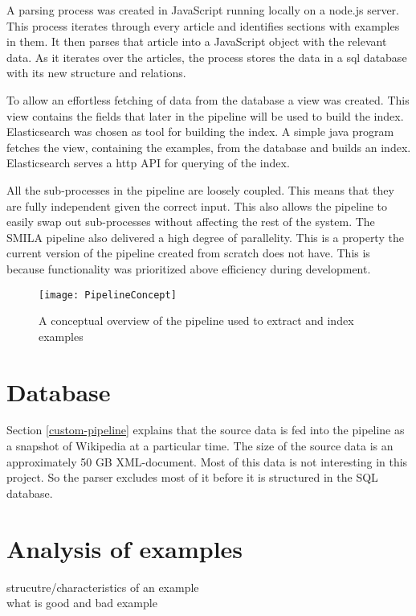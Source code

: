A parsing process was created in JavaScript running locally on a node.js server. This process iterates through every article and identifies sections with examples in them. It then parses that article into a JavaScript object with the relevant data. As it iterates over the articles, the process stores the data in a sql database with its new structure and relations. 

To allow an effortless fetching of data from the database a view was created. This view contains the fields that later in the pipeline will be used to build the index. Elasticsearch was chosen as tool for building the index. A simple java program fetches the view, containing the examples, from the database and builds an index. Elasticsearch serves a http API for querying of the index.

All the sub-processes in the pipeline are loosely coupled. This means that they are fully independent given the correct input. This also allows the pipeline to easily swap out sub-processes without affecting the rest of the system. The SMILA pipeline also delivered a high degree of parallelity. This is a property the current version of the pipeline created from scratch does not have. This is because functionality was prioritized above efficiency during development. 

\begin{figure}[h]
\caption{A conceptual overview of the pipeline used to extract and index examples}
\texttt{[image: PipelineConcept]}
\end{figure}



\section{Database}

Section \ref{custom-pipeline} explains that the source data is fed into the pipeline as a snapshot of Wikipedia at a particular time. The size of the source data is an approximately 50 GB XML-document. Most of this data is not interesting in this project. So the parser excludes most of it before it is structured in the SQL database. 

\section{Analysis of examples}
strucutre/characteristics of an example\\
what is good and bad example

\cleardoublepage